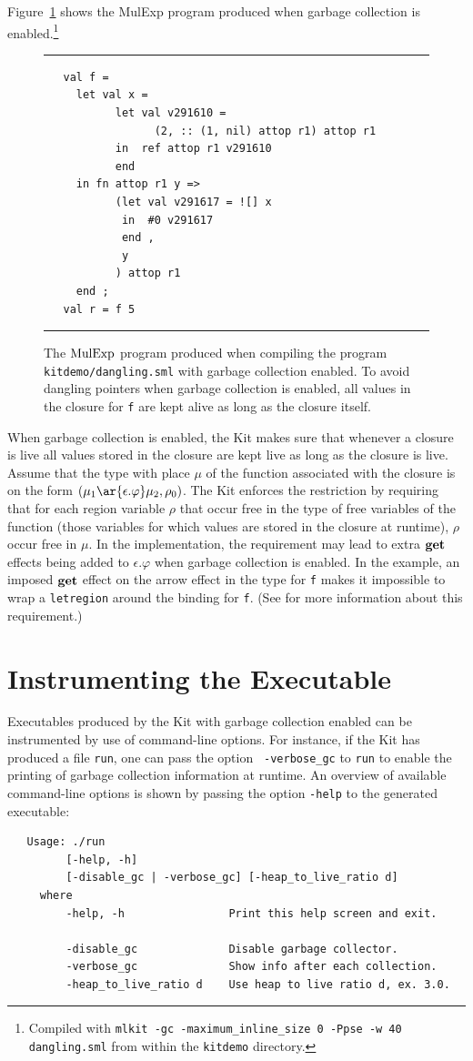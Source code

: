 \documentclass[12pt]{book}
\begin{document}
Figure~\ref{dangling_gc.fig} shows the MulExp program produced when
garbage collection is enabled.\footnote{Compiled with {\tt mlkit -gc
    -maximum\_inline\_size 0 -Ppse -w 40 dangling.sml} from within the
  {\tt kitdemo} directory.}
\begin{figure}[ht]
\hrule \medskip
\begin{verbatim}
   val f = 
     let val x = 
           let val v291610 = 
                 (2, :: (1, nil) attop r1) attop r1
           in  ref attop r1 v291610
           end 
     in fn attop r1 y => 
           (let val v291617 = ![] x
            in  #0 v291617
            end , 
            y
           ) attop r1
     end ; 
   val r = f 5
\end{verbatim}
\caption{The $\hbox{\rm MulExp}$ program produced when compiling the program 
  {\tt kitdemo/dangling.sml} with garbage collection enabled. To avoid
  dangling pointers when garbage collection is enabled, all values in
  the closure for {\tt f} are kept alive as long as the closure
  itself.}  \medskip \hrule
\label{dangling_gc.fig}
\end{figure}
When garbage collection is enabled, the Kit makes sure that whenever a
closure is live all values stored in the closure are kept live as long
as the closure is live.  Assume that the type with place $\mu$
of the function associated with the closure is on the form $(\mu_1
\ar{\epsilon.\varphi} \mu_2, \rho_0)$.  The Kit enforces the
restriction by requiring that for each region variable $\rho$ that
occur free in the type of free variables of the function (those
variables for which values are stored in the closure at runtime),
$\rho$ occur free in $\mu$. In the implementation, the requirement may
lead to extra $\mathop{\bf get}\nolimits$ effects being added to $\epsilon.\varphi$ when
garbage collection is enabled. In the example, an imposed $\mathop{\bf get}\nolimits$
effect on the arrow effect in the type for {\tt f} makes it impossible
to wrap a {\tt letregion} around the binding for {\tt f}. (See
\cite[page 50]{total93} for more information about this requirement.)

\section{Instrumenting the Executable}
Executables produced by the Kit with garbage collection enabled can be
instrumented by use of command-line options. For instance, if the Kit
has produced a file {\tt run}, one can pass the option {\tt
  -verbose\_gc} to {\tt run} to enable the printing of garbage
collection information at runtime. An overview of available
command-line options is shown by passing the option {\tt -help} to the
generated executable: {\small
\begin{verbatim}
   Usage: ./run
         [-help, -h] 
         [-disable_gc | -verbose_gc] [-heap_to_live_ratio d] 
     where
         -help, -h                Print this help screen and exit.

         -disable_gc              Disable garbage collector.
         -verbose_gc              Show info after each collection.
         -heap_to_live_ratio d    Use heap to live ratio d, ex. 3.0.
\end{verbatim}
}
\end{document}
